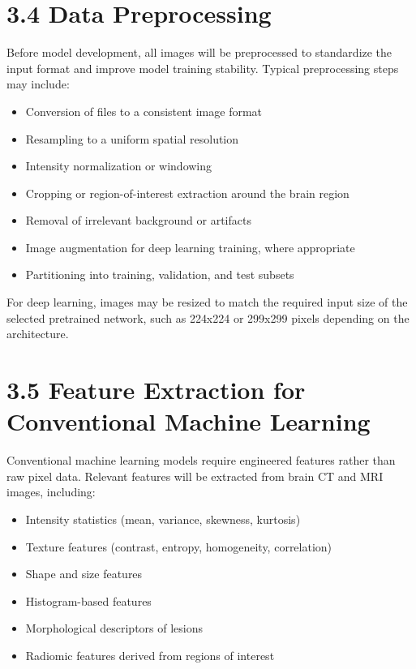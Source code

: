 \documentclass[12pt,a4paper]{report}
\begin{document}
\section{3.4 Data Preprocessing}

Before model development, all images will be preprocessed to standardize the input format and improve model training stability. Typical preprocessing steps may include:

\begin{itemize}
\item Conversion of files to a consistent image format
\item Resampling to a uniform spatial resolution
\item Intensity normalization or windowing
\item Cropping or region-of-interest extraction around the brain region
\item Removal of irrelevant background or artifacts
\item Image augmentation for deep learning training, where appropriate
\item Partitioning into training, validation, and test subsets
\end{itemize}

For deep learning, images may be resized to match the required input size of the selected pretrained network, such as 224x224 or 299x299 pixels depending on the architecture.

\section{3.5 Feature Extraction for Conventional Machine Learning}

Conventional machine learning models require engineered features rather than raw pixel data. Relevant features will be extracted from brain CT and MRI images, including:

\begin{itemize}
\item Intensity statistics (mean, variance, skewness, kurtosis)
\item Texture features (contrast, entropy, homogeneity, correlation)
\item Shape and size features
\item Histogram-based features
\item Morphological descriptors of lesions
\item Radiomic features derived from regions of interest
\end{itemize}
\end{document}
